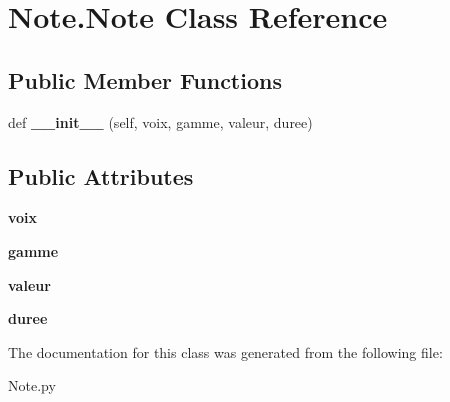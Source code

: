 \hypertarget{class_note_1_1_note}{}\section{Note.\+Note Class Reference}
\label{class_note_1_1_note}
\subsection*{Public Member Functions}
\begin{DoxyCompactItemize}
\item 
\mbox{\label{class_note_1_1_note_a923a207b94cc4aea8a2ec8557d06c47e}} 
def {\bfseries \+\_\+\+\_\+init\+\_\+\+\_\+} (self, voix, gamme, valeur, duree)
\end{DoxyCompactItemize}
\subsection*{Public Attributes}
\begin{DoxyCompactItemize}
\item 
\mbox{\label{class_note_1_1_note_a88ff6a6c244e916f600052b5c01323b0}} 
{\bfseries voix}
\item 
\mbox{\label{class_note_1_1_note_ae59c84760be90e76270c9007faa6e985}} 
{\bfseries gamme}
\item 
\mbox{\label{class_note_1_1_note_addb7aa3efa698baf8dc58118062ed6b5}} 
{\bfseries valeur}
\item 
\mbox{\label{class_note_1_1_note_a105cf8a7ad2db777596afbd6d5a42b05}} 
{\bfseries duree}
\end{DoxyCompactItemize}


The documentation for this class was generated from the following file\+:\begin{DoxyCompactItemize}
\item 
Note.\+py\end{DoxyCompactItemize}
